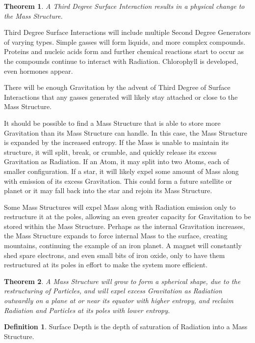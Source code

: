 \documentclass[12pt]{article}
\theoremstyle{plain}
\newtheorem{theorem}{Theorem}
\theoremstyle{definition}
\newtheorem{definition}{Definition}
\begin{document}
\begin{theorem}
A Third Degree Surface Interaction results in a physical change to the Mass Structure.
\end{theorem}

Third Degree Surface Interactions will include multiple Second Degree Generators of varying types. Simple gasses will form liquids, and more complex compounds. Proteins and nucleic acids form and further chemical reactions start to occur as the compounds continue to interact with Radiation. Chlorophyll is developed, even hormones appear.

There will be enough Gravitation by the advent of Third Degree of Surface Interactions that any gasses generated will likely stay attached or close to the Mass Structure.

It should be possible to find a Mass Structure that is able to store more Gravitation than its Mass Structure can handle. In this case, the Mass Structure is expanded by the increased entropy. If the Mass is unable to maintain its structure, it will split, break, or crumble, and quickly release its excess Gravitation as Radiation. If an Atom, it may split into two Atoms, each of smaller configuration. If a star, it will likely expel some amount of Mass along with emission of its excess Gravitation. This could form a future satellite or planet or it may fall back into the star and rejoin its Mass Structure.

Some Mass Structures will expel Mass along with Radiation emission only to restructure it at the poles, allowing an even greater capacity for Gravitation to be stored within the Mass Structure. Perhaps as the internal Gravitation increases, the Mass Structure expands to force internal Mass to the surface, creating mountains, continuing the example of an iron planet. A magnet will constantly shed spare electrons, and even small bits of iron oxide, only to have them restructured at its poles in effort to make the system more efficient.

\begin{theorem}
A Mass Structure will grow to form a spherical shape, due to the restructuring of Particles, and will expel excess Gravitation as Radiation outwardly on a plane at or near its equator with higher entropy, and reclaim Radiation and Particles at its poles with lower entropy.
\end{theorem}

\begin{definition}
Surface Depth is the depth of saturation of Radiation into a Mass Structure.
\end{definition}
\end{document}
